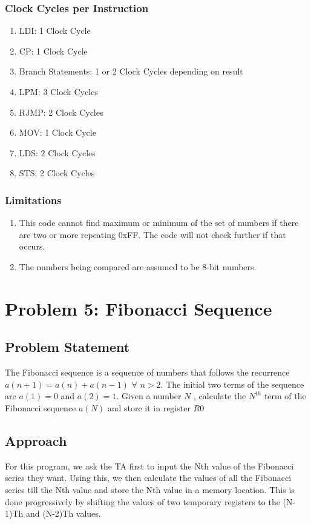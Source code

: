 \documentclass[titlepage, 11pt]{article}
\begin{document}
\subsubsection{Clock Cycles per Instruction}
\begin{enumerate}
\item LDI: 1 Clock Cycle
\item CP: 1 Clock Cycle
\item Branch Statements: 1 or 2 Clock Cycles depending on result
\item LPM: 3 Clock Cycles
\item RJMP: 2 Clock Cycles
\item MOV: 1 Clock Cycle
\item LDS: 2 Clock Cycles
\item STS: 2 Clock Cycles
\end{enumerate}

\subsubsection{Limitations}
\begin{enumerate}
\item This code cannot find maximum or minimum of the set of numbers if there are two or more repeating 0xFF. The code will not check further if that occurs.
\item The numbers being compared are assumed to be 8-bit numbers.
\end{enumerate}

\section{Problem 5: Fibonacci Sequence} 
\subsection{Problem Statement}
The Fibonacci sequence is a sequence of numbers that follows the recurrence $a(n+1) =a(n) + a (n-1)$ $\forall$ $n > 2$. The initial two terms of the sequence are $a (1) = 0$ and $a (2) = 1$. Given a number $N$ , calculate the $N^{th}$ term of the Fibonacci sequence $a(N)$ and store it in register $R0$

\subsection{Approach}
For this program, we ask the TA first to input the Nth value of the Fibonacci series they want. Using this, we then calculate the values of all the Fibonacci series till the Nth value and store the Nth value in a memory location. This is done progressively by shifting the values of two temporary registers to the (N-1)Th and (N-2)Th values.
\end{document}
